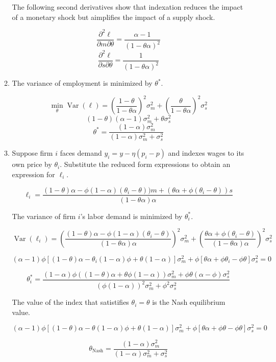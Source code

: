 \documentclass[11pt]{article}
\DeclareMathOperator{\var}{Var}
\begin{document}
\begin{enumerate}
\begin{enumerate}
            The following second derivatives show that indexation reduces the impact of a monetary shock but aimplifies the impact of a supply shock.

                $$ \frac{\partial^2 \ell}{\partial m \partial \theta} = \frac{\alpha - 1}{(1-\theta \alpha)^2} $$
                $$ \frac{\partial^2 \ell}{\partial s \partial \theta} = \frac{1}{(1-\theta \alpha)^2} $$

            \item The variance of employment is minimized by $\theta^*$.

                $$ \min_\theta \var(\ell) = \left(\frac{1-\theta}{1-\theta \alpha}\right)^2 \sigma^2_m + \left(\frac{\theta}{1-\theta \alpha}\right)^2 \sigma^2_s $$
                $$ (1-\theta)(\alpha-1) \sigma^2_m + \theta \sigma^2_s $$
                $$ \theta^* = \frac{(1-\alpha) \sigma^2_m}{(1-\alpha) \sigma^2_m + \sigma^2_s} $$

            \item Suppose firm $i$ faces demand $y_i = y - \eta(p_i - p)$ and indexes wages to its own price by $\theta_i$. Substitute the reduced form expressions to obtain an expression for $\ell_i$.

                $$ \ell_i = \frac{(1-\theta) \alpha - \phi (1-\alpha) (\theta_i - \theta)) m + (\theta \alpha + \phi (\theta_i - \theta)) s}{(1-\theta \alpha) \alpha} $$

            The variance of firm $i$'s labor demand is minimized by $\theta_i^*$.

                $$ \var(\ell_i) = \left(\frac{(1-\theta) \alpha - \phi (1-\alpha) (\theta_i - \theta)}{(1-\theta \alpha) \alpha}\right)^2 \sigma^2_m + \left(\frac{\theta \alpha + \phi (\theta_i - \theta)}{(1-\theta \alpha) \alpha}\right)^2 \sigma^2_s $$

                $$ (\alpha - 1) \phi [(1-\theta) \alpha - \theta_i (1-\alpha) \phi + \theta (1-\alpha)] \sigma^2_m + \phi[\theta \alpha + \phi \theta_i - \phi \theta] \sigma^2_s = 0 $$

                $$ \theta_i^* = \frac{(1-\alpha) \phi ((1-\theta)\alpha + \theta \phi (1-\alpha)) \sigma^2_m + \phi \theta(\alpha - \phi) \sigma^2_s}{(\phi(1-\alpha))^2 \sigma^2_m + \phi^2 \sigma^2_s} $$

            The value of the index that satistifies $\theta_i = \theta$ is the Nash equilibrium value.

            $$ (\alpha - 1) \phi [(1-\theta) \alpha - \theta (1-\alpha) \phi + \theta (1-\alpha)] \sigma^2_m + \phi[\theta \alpha + \phi \theta - \phi \theta] \sigma^2_s = 0 $$

            $$ \theta_{\text{Nash}} = \frac{(1-\alpha) \sigma^2_m}{(1-\alpha) \sigma^2_m + \sigma^2_s} $$

        \end{enumerate}

    \end{enumerate}
\end{document}
